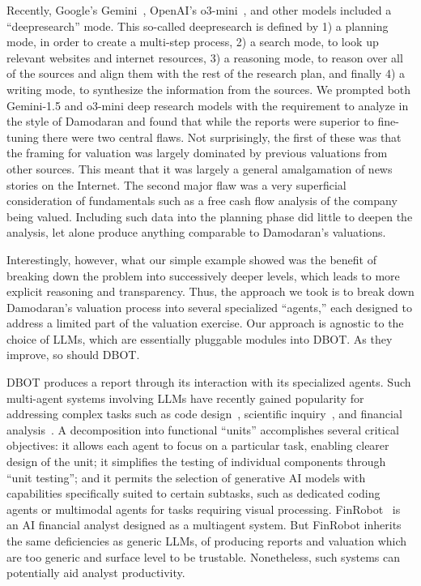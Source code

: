 \documentclass[]{interact}
\theoremstyle{plain}%
\theoremstyle{definition}
\theoremstyle{remark}
\begin{document}
Recently, Google's Gemini~\citep{GoogleGeminiDeepResearch}, OpenAI's o3-mini~\citep{openai2025deepresearch}, and other models included a ``deepresearch'' mode. This so-called deepresearch is defined by 1) a planning mode, in order to create a multi-step process, 2) a search mode, to look up relevant websites and internet resources, 3) a reasoning mode, to reason over all of the sources and align them with the rest of the research plan, and finally 4) a writing mode, to synthesize the information from the sources. We prompted both Gemini-1.5 and o3-mini deep research models with the requirement to analyze in the style of Damodaran and found that while the reports were superior to fine-tuning there were two central flaws. Not surprisingly, the first of these was that the framing for valuation was largely dominated by previous valuations from other sources. This meant that it was largely a general amalgamation of news stories on the Internet. The second major flaw was a very superficial consideration of fundamentals such as a free cash flow analysis of the company being valued. Including such data into the planning phase did little to deepen the analysis, let alone produce anything comparable to Damodaran's valuations.

Interestingly, however, what our simple example showed was the benefit of breaking down the problem into successively deeper levels, which leads to more explicit reasoning and transparency. Thus, the approach we took is to break down Damodaran’s valuation process into several specialized ``agents,'' each designed to address a limited part of the valuation exercise. Our approach is agnostic to the choice of LLMs, which are essentially pluggable modules into DBOT. As they improve, so should DBOT.

DBOT produces a report through its interaction with its specialized agents. %
Such multi-agent systems involving LLMs have recently gained popularity for addressing complex tasks such as code design~\citep{hong2024metagpt}, scientific inquiry~\citep{lu2024ai}, and financial analysis~\citep{zhou2024finrobot}. A decomposition into functional ``units'' accomplishes several critical objectives: it allows each agent to focus on a particular task, enabling clearer design of the unit; it simplifies the testing of individual components through ``unit testing''; and it permits the selection of generative AI models with capabilities specifically suited to certain subtasks, such as dedicated coding agents or multimodal agents for tasks requiring visual processing. FinRobot~\citep{zhou2024finrobot} is an AI financial analyst designed as a multiagent system.  But FinRobot inherits the same deficiencies as generic LLMs, of producing reports and valuation which are too generic and surface level to be trustable. Nonetheless, such systems can potentially aid analyst productivity.
\end{document}
